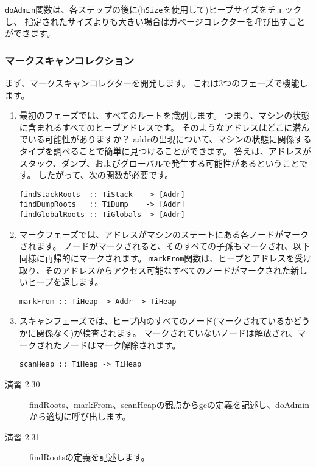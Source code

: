 \documentclass{jarticle}
\begin{document}
\texttt{doAdmin}関数は、各ステップの後に(\texttt{hSize}を使用して)ヒープサイズをチェックし、
指定されたサイズよりも大きい場合はガベージコレクターを呼び出すことができます。

\subsubsection{マークスキャンコレクション}

まず、マークスキャンコレクターを開発します。
これは3つのフェーズで機能します。

\begin{enumerate}
	\item 最初のフェーズでは、すべてのルートを識別します。 つまり、マシンの状態に含まれるすべてのヒープアドレスです。
	      そのようなアドレスはどこに潜んでいる可能性がありますか？
	      addrの出現について、マシンの状態に関係するタイプを調べることで簡単に見つけることができます。
	      答えは、アドレスがスタック、ダンプ、およびグローバルで発生する可能性があるということです。
	      したがって、次の関数が必要です。
	      \begin{verbatim}
findStackRoots  :: TiStack   -> [Addr]
findDumpRoots   :: TiDump    -> [Addr]
findGlobalRoots :: TiGlobals -> [Addr]
\end{verbatim}
	\item マークフェーズでは、アドレスがマシンのステートにある各ノードがマークされます。
	      ノードがマークされると、そのすべての子孫もマークされ、以下同様に再帰的にマークされます。
	      \texttt{markFrom}関数は、ヒープとアドレスを受け取り、そのアドレスからアクセス可能なすべてのノードがマークされた新しいヒープを返します。
	      \begin{verbatim}
markFrom :: TiHeap -> Addr -> TiHeap
\end{verbatim}
	\item スキャンフェーズでは、ヒープ内のすべてのノード(マークされているかどうかに関係なく)が検査されます。
	      マークされていないノードは解放され、マークされたノードはマーク解除されます。
	      \begin{verbatim}
scanHeap :: TiHeap -> TiHeap
\end{verbatim}
\end{enumerate}

\begin{description}
	\item[演習 2.30] findRoots、markFrom、scanHeapの観点からgcの定義を記述し、doAdminから適切に呼び出します。
	\item[演習 2.31] findRootsの定義を記述します。
\end{description}
\end{document}
